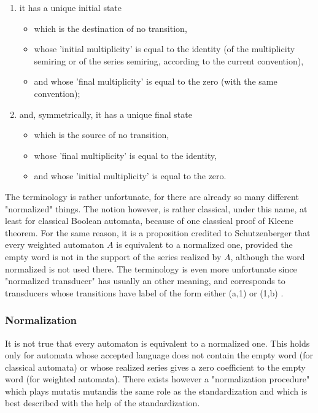 \begin{enumerate}
\item it has a unique initial state
  \begin{itemize}
  \item which is the destination of no transition,
  \item whose 'initial multiplicity' is equal to the identity (of the
    multiplicity semiring or of the series semiring, according to the
    current convention),
  \item and whose 'final multiplicity' is equal to the zero (with the
    same convention);
  \end{itemize}

\item and, symmetrically, it has a unique final state
  \begin{itemize}
  \item which is the source of no transition,
  \item whose 'final multiplicity' is equal to the identity,
  \item and whose 'initial multiplicity' is equal to the zero.
  \end{itemize}
\end{enumerate}

\begin{remark}
  The terminology is rather unfortunate, for there are already so many
  different "normalized" things. The notion however, is rather
  classical, under this name, at least for classical Boolean
  automata, because of one classical proof of Kleene theorem. For the
  same reason, it is a proposition credited to Schutzenberger that
  every weighted automaton $A$ is equivalent to a normalized one,
  provided the empty word is not in the support of the series realized
  by $A$, although the word normalized is not used there. The
  terminology is even more unfortunate since "normalized transducer"
  has usually an other meaning, and corresponds to transducers whose
  transitions have label of the form either (a,1) or (1,b) .
\end{remark}

\subsubsection{Normalization}

It is not true that every automaton is equivalent to a normalized one.
This holds only for automata whose accepted language does not contain
the empty word (for classical automata) or whose realized series gives
a zero coefficient to the empty word (for weighted automata). There
exists however a "normalization procedure" which plays mutatis
mutandis the same role as the standardization and which is best
described with the help of the standardization.

